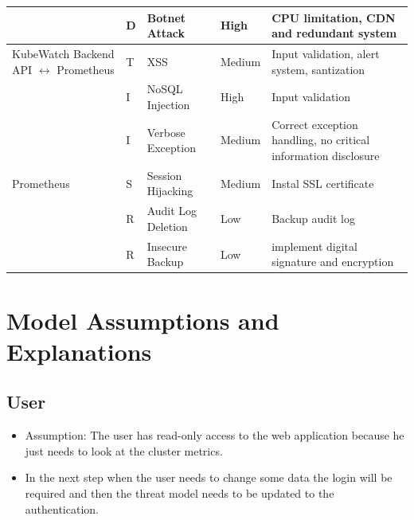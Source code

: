 \begin{longtable}[h!]{p{2.1cm} p{1.8cm} p{3cm} p{2cm} p{3.5cm}}
                        & D & Botnet Attack & High & CPU limitation, CDN and redundant system \\
    \hline
    KubeWatch Backend API \(\leftrightarrow\) Prometheus
                        & T & XSS & Medium & Input validation, alert system, santization \\
                        & I & NoSQL Injection & High & Input validation \\
                        & I & Verbose Exception & Medium & Correct exception handling, no critical information disclosure \\
    \hline
    Prometheus          & S & Session Hijacking & Medium & Instal SSL certificate \\
                        & R & Audit Log Deletion & Low & Backup audit log \\
                        & R & Insecure Backup & Low & implement digital signature and encryption \\
    \hline
\end{longtable}


\section{Model Assumptions and Explanations}

\subsection{User}
\begin{itemize}
    \item Assumption: The user has read-only access to the web application because he just needs to look at the cluster metrics.
    \item In the next step when the user needs to change some data the login will be required and then the threat model needs to be updated to the authentication.
\end{itemize}


